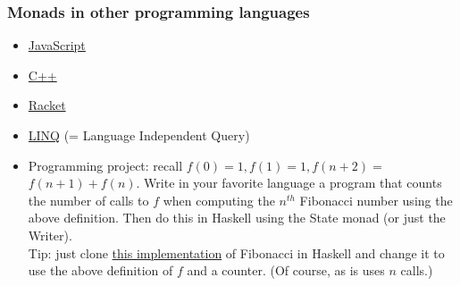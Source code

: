 \documentclass[handout]{beamer}
\newcommand{\ttt}[1]{\text{\tt #1}}
\begin{document}
\frame
  {   
    \frametitle{Monads in other programming languages}\label{Mon5:InOtherPL}

 \begin{itemize}[<+->]

 \item  \href{https://curiosity-driven.org/monads-in-javascript}{\color{blue}JavaScript}

\item  \href{https://bartoszmilewski.com/2011/07/11/monads-in-c/}{\color{blue} C{+}{+}}

\item \href{https://docs.racket-lang.org/heresy/monad-do.html}
{\color{blue} Racket}

\item \href{https://dl.acm.org/doi/pdf/10.1145/1924421.1924436}
{\color{blue} LINQ} (= Language Independent Query)

\item Programming project: recall $f(0)=1, f(1)=1, f(n+2)=$ $f(n+1)+f(n)$.
Write in your favorite language a program that counts the number of calls to $f$
when computing the $n^{th}$ Fibonacci number using the above definition.
Then do this in Haskell using the State monad (or just the Writer). \\
Tip: just clone
\href{https://github.com/mauget/fibonacci}{\color{blue}this implementation}
of Fibonacci in Haskell and change it to use the above definition of $f$ and
a counter. (Of course, \ttt{fibsState} as is uses $n$ calls.)

 \end{itemize}
 }
\end{document}
